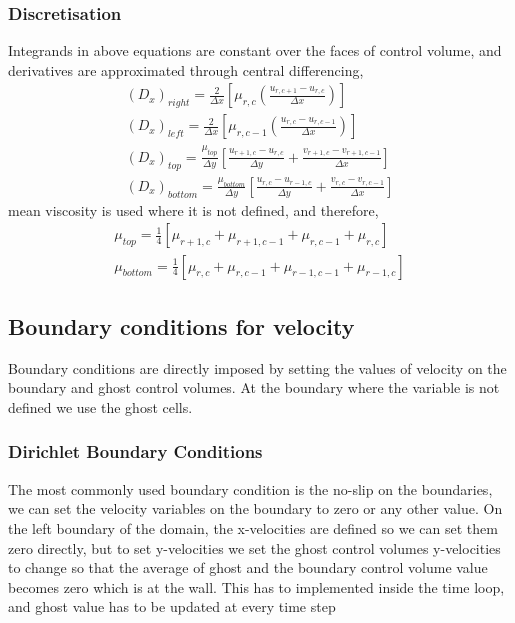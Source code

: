 \subsubsection{Discretisation}
Integrands in above equations are constant over the faces of control volume, and derivatives are approximated through central differencing,
\begin{eqnarray*}
(D_x)_{right} = \frac{2}{\Delta x}\left[\mu_{r,c}\left(\frac{u_{r,c+1}-u_{r,c}}{\Delta x}\right)\right]\\
(D_x)_{left} = \frac{2}{\Delta x}\left[\mu_{r,c-1}\left(\frac{u_{r,c}-u_{r,c-1}}{\Delta x}\right)\right]\\
(D_x)_{top} = \frac{\mu_{top}}{\Delta y}\left[\frac{u_{r+1,c}-u_{r,c}}{\Delta y}+\frac{v_{r+1,c}-v_{r+1,c-1}}{\Delta x}\right]\\
(D_x)_{bottom} = \frac{\mu_{bottom}}{\Delta y}\left[\frac{u_{r,c}-u_{r-1,c}}{\Delta y}+\frac{v_{r,c}-v_{r,c-1}}{\Delta x}\right]
\end{eqnarray*}
mean viscosity is used where it is not defined, and therefore, \\
\begin{equation*}
\boxed{ \begin{align}
 \mu_{top}= \frac{1}{4}[\mu_{r+1,c}+\mu_{r+1,c-1}+\mu_{r,c-1}+\mu_{r,c}] \\
  \mu_{bottom}= \frac{1}{4}[\mu_{r,c}+\mu_{r,c-1}+\mu_{r-1,c-1}+\mu_{r-1,c}]
  \end{align} }
  \end{equation*}
  
  \subsection{Boundary conditions for velocity}
Boundary conditions are directly imposed by setting the values of velocity on the boundary and ghost control volumes. At the boundary where the variable is not defined we use the 
ghost cells.
\subsubsection{Dirichlet Boundary Conditions}
The most commonly used boundary condition is the no-slip on the boundaries, we can set the velocity variables on the boundary to zero or any other value. On the left boundary of the 
domain, the x-velocities are defined so we can set them zero directly, but to set y-velocities we set the ghost control volumes y-velocities to change so that the average of ghost and 
the boundary control volume value becomes zero which is at the wall. This has to implemented inside the time loop, and ghost value has to be updated at every time step 

